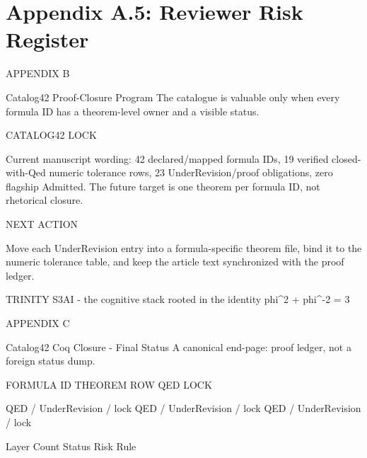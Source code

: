 
\section{Appendix A.5: Reviewer Risk Register}

APPENDIX B

           Catalog42 Proof-Closure Program
     The catalogue is valuable only when every formula ID has a theorem-level owner and
                                       a visible status.

  CATALOG42 LOCK

  Current manuscript wording: 42 declared/mapped formula IDs, 19 verified closed-with-Qed numeric tolerance
  rows, 23 UnderRevision/proof obligations, zero flagship Admitted. The future target is one theorem per
  formula ID, not rhetorical closure.

  NEXT ACTION

  Move each UnderRevision entry into a formula-specific theorem file, bind it to the numeric tolerance
  table, and keep the article text synchronized with the proof ledger.

                           TRINITY S3AI - the cognitive stack rooted in the identity phi^2 + phi^-2 = 3

                                                               APPENDIX C

             Catalog42 Coq Closure - Final Status
                           A canonical end-page: proof ledger, not a foreign status dump.

                      FORMULA ID                             THEOREM ROW                                    QED LOCK

                  QED / UnderRevision / lock               QED / UnderRevision / lock                QED / UnderRevision / lock

             Layer                             Count                      Status                           Risk                      Rule